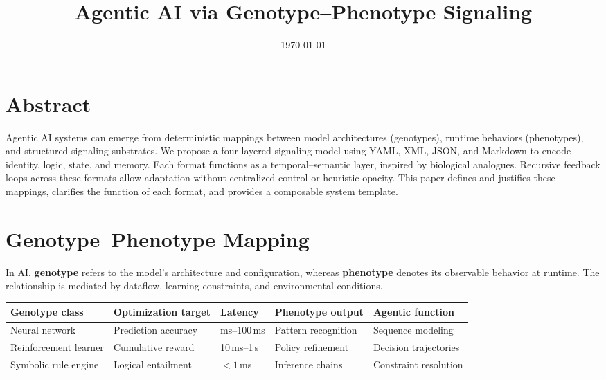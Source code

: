 \documentclass{article}
\title{Agentic AI via Genotype--Phenotype Signaling}
\author{}
\date{\today}
\begin{document}
\maketitle

\section*{Abstract}
Agentic AI systems can emerge from deterministic mappings between model architectures (genotypes), runtime behaviors (phenotypes), and structured signaling substrates. We propose a four-layered signaling model using YAML, XML, JSON, and Markdown to encode identity, logic, state, and memory. Each format functions as a temporal–semantic layer, inspired by biological analogues. Recursive feedback loops across these formats allow adaptation without centralized control or heuristic opacity. This paper defines and justifies these mappings, clarifies the function of each format, and provides a composable system template.

\section{Genotype--Phenotype Mapping}
In AI, \textbf{genotype} refers to the model's architecture and configuration, whereas \textbf{phenotype} denotes its observable behavior at runtime. The relationship is mediated by dataflow, learning constraints, and environmental conditions.

\begin{longtable}{|P{3.3cm}|P{3.3cm}|P{2.3cm}|P{3.4cm}|P{3.4cm}|}
\hline
\textbf{Genotype class} & \textbf{Optimization target} & \textbf{Latency} & \textbf{Phenotype output} & \textbf{Agentic function} \\
\hline
Neural network        & Prediction accuracy   & ms--100\,ms & Pattern recognition      & Sequence modeling \\
Reinforcement learner & Cumulative reward     & 10\,ms--1\,s & Policy refinement        & Decision trajectories \\
Symbolic rule engine  & Logical entailment    & $<\!1$\,ms & Inference chains         & Constraint resolution \\
\hline
\end{longtable}

\end{document}
